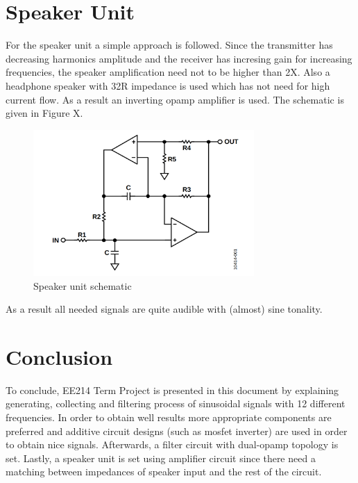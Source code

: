 \documentclass[letterpaper,12pt]{article}
\begin{document}
\section{Speaker Unit}
For the speaker unit a simple approach is followed. Since the transmitter has decreasing harmonics amplitude and the receiver has incresing gain for increasing frequencies, the speaker amplification need not to be  higher than 2X. Also a headphone speaker with 32R impedance is used which has not need for high current flow. As a result an inverting opamp amplifier is used. The schematic is given in Figure X.
\begin{figure}[H]
    \centering
    \includegraphics[width = 0.75\textwidth]{dualopamp.png}
    \caption{Speaker unit schematic}
\end{figure}
As a result all needed signals are quite audible with (almost) sine tonality. 

\section{Conclusion}
 To conclude, EE214 Term Project is presented in this document by explaining generating, collecting and filtering process of sinusoidal signals with 12 different frequencies. In order to obtain well results more appropriate components are preferred and additive circuit designs (such as mosfet inverter) are used in order to obtain nice signals. Afterwards, a filter circuit with dual-opamp topology is set. Lastly, a speaker unit is set using amplifier circuit since there need a matching between impedances of speaker input and the rest of the circuit.    
\end{document}
